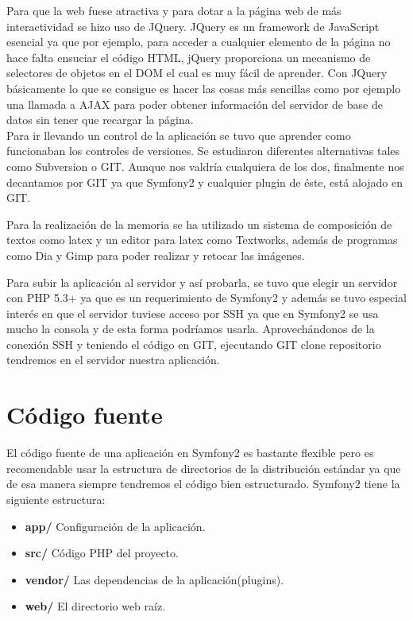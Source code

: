 Para que la web fuese atractiva y para dotar a la página web de más interactividad se hizo uso de \ac{JQuery}. JQuery es un framework de \ac{JavaScript} esencial ya que por ejemplo, para acceder a cualquier elemento de la página no hace falta ensuciar el código HTML, jQuery proporciona un mecanismo de selectores de objetos en el DOM el cual es muy fácil de aprender. Con \ac{JQuery} básicamente lo que se consigue es hacer las cosas más sencillas como por ejemplo una llamada a \ac{AJAX} para poder obtener información del servidor de base de datos sin tener que recargar la página. \\

Para ir llevando un control de la aplicación se tuvo que aprender como funcionaban los controles de versiones. Se estudiaron diferentes alternativas tales como Subversion o GIT. Aunque nos valdría cualquiera de los dos, finalmente nos decantamos por GIT ya que Symfony2 y cualquier plugin de éste, está alojado en GIT.

Para la realización de la memoria se ha utilizado un sistema de composición de textos como latex y un editor para latex como Textworks, además de programas como Dia y Gimp para poder realizar y retocar las imágenes.

Para subir la aplicación al servidor y así probarla, se tuvo que elegir un servidor con PHP 5.3+ ya que es un requerimiento de Symfony2 y además se tuvo especial interés en que el servidor tuviese acceso por \ac{SSH} ya que en Symfony2 se usa mucho la consola y de esta forma podríamos usarla. Aprovechándonos de la conexión SSH y teniendo el código en GIT, ejecutando GIT clone repositorio tendremos en el servidor nuestra aplicación.

\section{Código fuente}

El código fuente de una aplicación en Symfony2 es bastante flexible pero es recomendable usar la estructura de directorios de la distribución estándar ya que de esa manera siempre tendremos el código bien estructurado. Symfony2 tiene la siguiente estructura:

\begin{itemize}
\item \textbf{app/} Configuración de la aplicación. 
\item \textbf{src/} Código PHP del proyecto.
\item \textbf{vendor/} Las dependencias de la aplicación(plugins).
\item \textbf{web/} El directorio web raíz.
\end{itemize}

